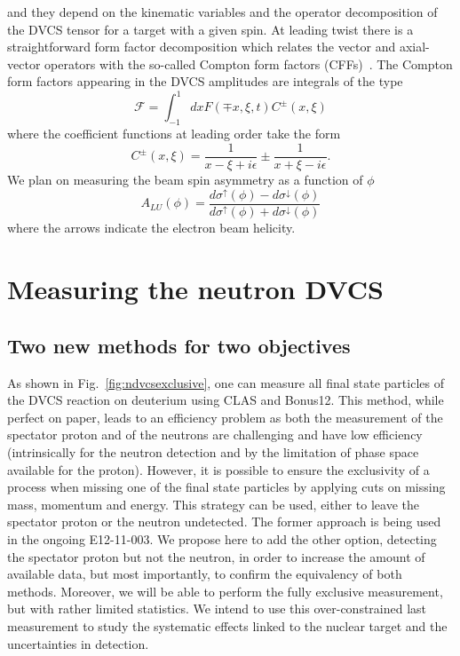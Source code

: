 and they depend on the kinematic variables and the operator decomposition of 
the DVCS tensor for a target with a given spin. At leading twist there is a 
straightforward form factor decomposition which relates the vector and 
axial-vector operators with the so-called Compton form factors 
(CFFs)~\cite{Belitsky:2000gz}. The Compton form factors appearing in the DVCS 
amplitudes are integrals of the type
%
%
\begin{equation}
   \mathcal{F} = \int_{-1}^{1} dx F(\mp x,\xi,t) C^{\pm}(x,\xi)
\end{equation}
where the coefficient functions at leading order take the form
\begin{equation}
   C^{\pm}(x,\xi) = \frac{1}{x-\xi + i\epsilon} \pm \frac{1}{x+\xi - 
   i\epsilon}.
\end{equation}
%
We plan on measuring the beam spin asymmetry as a function of $\phi$
\begin{equation}
   A_{LU}(\phi) = \frac{d\sigma^{\uparrow}(\phi) - 
   d\sigma^{\downarrow}(\phi)}{d\sigma^{\uparrow}(\phi) + 
   d\sigma^{\downarrow}(\phi)}
\end{equation}
%
where the arrows indicate the electron beam helicity. 

\section{Measuring the neutron DVCS}

\subsection{Two new methods for two objectives}

As shown in Fig.~\ref{fig:ndvcsexclusive}, one can measure all final state 
particles of the DVCS reaction on deuterium using CLAS and Bonus12. This 
method, while perfect on paper, leads to an efficiency problem
as both the measurement of the spectator proton and of the neutrons are challenging
and have low efficiency (intrinsically for the neutron detection and by the 
limitation of phase space available for the proton). However, it is possible to 
ensure the exclusivity of a process when missing one of the final state 
particles by applying cuts on missing mass, momentum and energy. This strategy 
can be used, either to leave the spectator proton or the neutron undetected.  
The former approach is being used in the ongoing E12-11-003. We propose here to 
add the other option, detecting the spectator proton but not the neutron, in 
order to increase the amount of available data, but most importantly, to 
confirm the equivalency of both methods. Moreover, we will be able to
perform the fully exclusive measurement, but with rather limited statistics. We
intend to use this over-constrained last measurement to study the systematic effects 
linked to the nuclear target and the uncertainties in detection.

